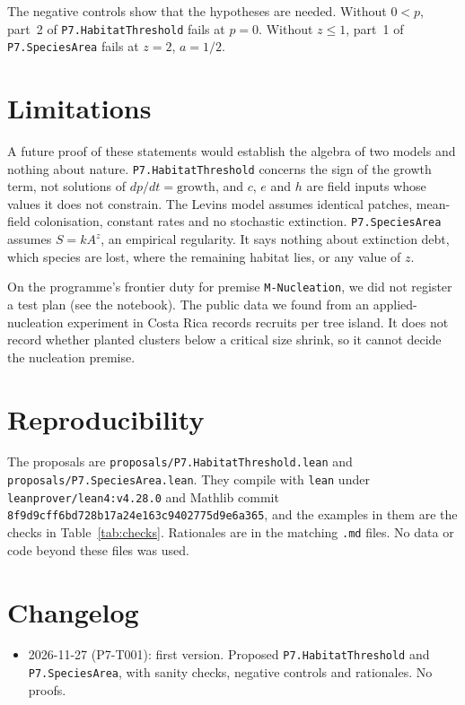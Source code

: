 \documentclass[11pt]{article}
\begin{document}
The negative controls show that the hypotheses are needed. Without $0<p$, part~2 of
\texttt{P7.HabitatThreshold} fails at $p=0$. Without $z\le1$, part~1 of \texttt{P7.SpeciesArea}
fails at $z=2$, $a=1/2$.

\section{Limitations}
A future proof of these statements would establish the algebra of two models and nothing about
nature. \texttt{P7.HabitatThreshold} concerns the sign of the growth term, not solutions of
$dp/dt=\mathrm{growth}$, and $c$, $e$ and $h$ are field inputs whose values it does not
constrain. The Levins model assumes identical patches, mean-field colonisation, constant rates and
no stochastic extinction. \texttt{P7.SpeciesArea} assumes $S=kA^z$, an empirical regularity. It says
nothing about extinction debt, which species are lost, where the remaining habitat lies, or any
value of $z$.

On the programme's frontier duty for premise \texttt{M-Nucleation}, we did not register a test
plan (see the notebook). The public data we found from an applied-nucleation experiment in Costa
Rica \citep{Zahawi2013} records recruits per tree island. It does not record whether planted
clusters below a critical size shrink, so it cannot decide the nucleation premise.

\section{Reproducibility}
The proposals are \texttt{proposals/P7.HabitatThreshold.lean} and
\texttt{proposals/P7.SpeciesArea.lean}. They compile with \texttt{lean} under
\texttt{leanprover/lean4:v4.28.0} and Mathlib commit
\texttt{8f9d9cff6bd728b17a24e163c9402775d9e6a365}, and the examples in them are the checks in
Table~\ref{tab:checks}. Rationales are in the matching \texttt{.md} files. No data or code beyond
these files was used.

\section{Changelog}
\begin{itemize}
\item 2026-11-27 (P7-T001): first version. Proposed \texttt{P7.HabitatThreshold} and
\texttt{P7.SpeciesArea}, with sanity checks, negative controls and rationales. No proofs.
\end{itemize}



\end{document}
